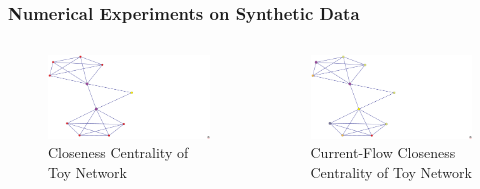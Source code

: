 \documentclass{beamer}
\begin{document}
\begin{frame}
\frametitle{Numerical Experiments on Synthetic Data}
\begin{columns}[T]
\begin{column}{.5\textwidth}
\begin{figure}[h]
\begin{center}
\includegraphics[width=0.76\columnwidth]{toy_closeness}
\end{center}
\caption{Closeness Centrality of Toy Network}
\label{fig:Closeness Centrality - Toy}
\end{figure}
\end{column}
\begin{column}{.5\textwidth}
\begin{figure}[h]
\begin{center}
\includegraphics[width=0.76\columnwidth]{toy_current_flow_closeness}
\end{center}
\caption{Current-Flow Closeness Centrality of Toy Network}
\label{fig:Current Flow Closeness Centrality - Toy}
\end{figure}
\end{column}
\end{columns}
\end{frame}
\end{document}
